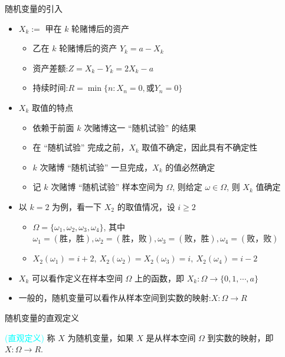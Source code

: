 \begin{frame}{随机变量的引入}
	\begin{itemize}[<+-|alert@+>]
		\item $X_k:=$ 甲在 $k$ 轮赌博后的资产
		      \begin{itemize}[<+-|alert@+>]
			      \item 乙在 $k$ 轮赌博后的资产 $Y_k=a-X_k$
			      \item 资产差额:$Z=X_k-Y_k=2X_k-a$
			      \item 持续时间:$R=\min\{n: X_n=0, \mbox{或} Y_n=0\}$
		      \end{itemize}
		\item $X_k$ 取值的特点
		      \begin{itemize}[<+-|alert@+>]
			      \item 依赖于前面 $k$ 次赌博这一 “随机试验” 的结果
			      \item 在 “随机试验” 完成之前，$X_k$ 取值不确定，因此具有不确定性
			      \item $k$ 次赌博 “随机试验” 一旦完成，$X_k$ 的值必然确定
			      \item 记 $k$ 次赌博 “随机试验” 样本空间为 $\Omega$, 则给定 $\omega\in\Omega$, 则 $X_k$ 值确定
		      \end{itemize}
		\item 以 $k=2$ 为例，看一下 $X_2$ 的取值情况，设 $i\geq 2$
		      \begin{itemize}[<+-|alert@+>]
			      \item $\Omega=\{\omega_1,\omega_2, \omega_3,\omega_4\}$, 其中 $\omega_1=(\mbox{胜，胜}), \omega_2=(\mbox{胜，败}), \omega_3=(\mbox{败，胜}), \omega_4=(\mbox{败，败})$
			      \item $X_2(\omega_1)=i+2,\  X_2(\omega_2)=X_2(\omega_3)=i,\  X_2(\omega_4)=i-2$
		      \end{itemize}
		\item $X_k$ 可以看作定义在样本空间 $\Omega$ 上的函数，即 $X_k:\Omega\rightarrow \{0, 1,\cdots, a\}$
		\item 一般的，随机变量可以看作从样本空间到实数的映射:$X:\Omega\rightarrow R$

	\end{itemize}

\end{frame}
\begin{frame}{随机变量的直观定义}
	\begin{defi} \textcolor{cyan}{(直观定义)}
		称 $X$ 为随机变量，如果 $X$ 是从样本空间 $\Omega$ 到实数的映射，即 $X:\Omega\rightarrow R$.
	\end{defi}

\end{frame}
